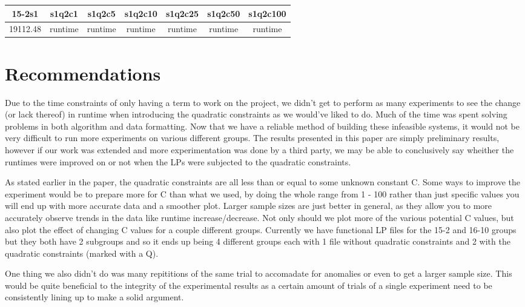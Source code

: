 \documentclass[11pt]{article} %
\theoremstyle{definition}
\theoremstyle{remark}
\begin{document}
\begin{center}
 \begin{tabular}{||c c c c c c c||} 
 \hline
 15-2s1 & s1q2c1 & s1q2c5 & s1q2c10 & s1q2c25 & s1q2c50 & s1q2c100\\ [1.5ex] 
 \hline\hline
  19112.48 & runtime & runtime & runtime & runtime & runtime & runtime
 \\\hline
\end{tabular}
\end{center}



\section{Recommendations}

Due to the time constraints of only having a term to work on the project, we didn't get to perform as many experiments to see the change (or lack thereof) in runtime when introducing the quadratic constraints as we would've liked to do. Much of the time was spent solving problems in both algorithm and data formatting. Now that we have a reliable method of building these infeasible systems, it would not be very difficult to run more experiments on various different groups. The results presented in this paper are simply preliminary results, however if our work was extended and more experimentation was done by a third party, we may be able to conclusively say wheither the runtimes were improved on or not when the LPs were subjected to the quadratic constraints.

As stated earlier in the paper, the quadratic constraints are all less than or equal to some unknown constant C. Some ways to improve the experiment would be to prepare more for C than what we used, by doing the whole range from 1 - 100 rather than just specific values you will end up with more accurate data and a smoother plot. Larger sample sizes are just better in general, as they allow you to more accurately observe trends in the data like runtime increase/decrease. Not only should we plot more of the various potential C values, but also plot the effect of changing C values for a couple different groups. Currently we have functional LP files for the 15-2 and 16-10 groups but they both have 2 subgroups and so it ends up being 4 different groups each with 1 file without quadratic constraints and 2 with the quadratic constraints (marked with a Q).

One thing we also didn't do was many repititions of the same trial to accomadate for anomalies or even to get a larger sample size. This would be quite beneficial to the integrity of the experimental results as a certain amount of trials of a single experiment need to be consistently lining up to make a solid argument.   
\end{document}
